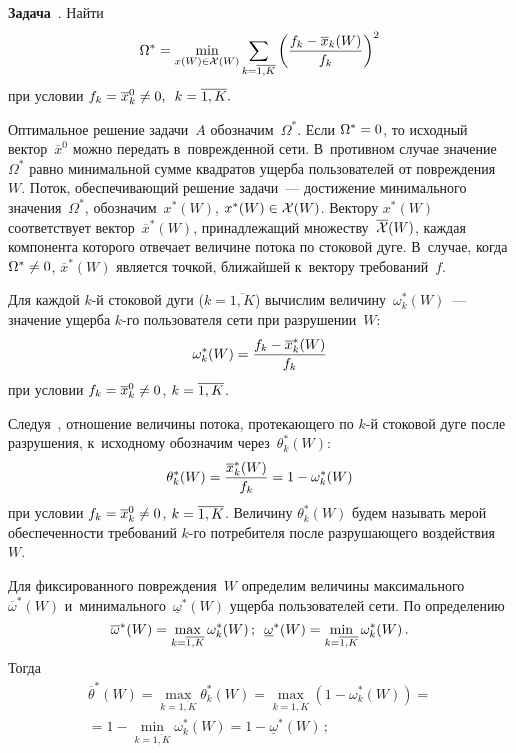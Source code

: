 \begin{multicols}{2}
\smallskip

\noindent
\textbf{Задача}~{}. Найти
$$
 \Omega^* =  \min\limits_{x(W) \in {\cal X}(W)} 
\sum\limits_{k = \overline{1, K}} \left(\displaystyle\frac{\displaystyle f_k - \overline x_k(W)\mathstrut}{\displaystyle f_k\mathstrut}\right)^2 
$$
при условии
$f_k\hm =  \overline x_k^0 \neq 0, \enskip k = \overline{1, K}.$

Оптимальное решение задачи~$A$ обозначим~$\Omega^*$. Если $\Omega^* \hm= 0$, 
то исходный вектор~$\overline x^0$ можно передать в~поврежденной сети.
В~противном случае значение~$\Omega^*$ равно минимальной сумме квадратов 
ущерба пользователей от повреждения~$W$.
Поток, обеспечивающий решение задачи~--- достижение минимального значения~$\Omega^*$, 
обозначим~$x^*(W)$, $x^*(W) \hm\in 
{\cal X}(W)$. Вектору $x^*(W)$ соответствует
вектор~$\overline {x}^*(W)$, принадлежащий множеству~$\overline {\cal X}(W)$, 
каж\-дая компонента которого отвечает величине потока по стоковой дуге. 
В~случае, когда $\Omega^* \hm\neq 0$, $\overline {x}^*(W)$ является точкой, 
ближайшей к~вектору требований~$f$.

Для каждой $k$-й стоковой дуги ($k = \overline{1, K}$) вычислим 
величину~$ \omega_k^*(W)$~--- значение ущерба $k$-го  пользователя сети 
при разрушении~$W$:
$$
\omega_k^*(W)=\displaystyle\frac{\displaystyle f_k - \overline x_k^*(W)\mathstrut}{\displaystyle f_k\mathstrut}
$$
при условии 
$f_k \hm=\overline x_k^0 \hm\neq 0$, $k \hm= \overline{1, K}$. 

\pagebreak

Следуя~\cite{Mal99}, отношение величины потока, протекающего по $k$-й стоковой 
дуге после разрушения, к~исходному обозначим через~$\theta_k^*(W)$:
$$
 \theta_k^*(W) = \displaystyle\frac{\displaystyle \overline x_k^*(W)\mathstrut}{\displaystyle f_k\mathstrut} = 1  -  \omega_k^*(W)
 $$  
 при условии 
 $f_k =  \overline x_k^0\hm\neq 0$, $k \hm= \overline{1, K}$.
Величину $\theta_k^*(W)$ будем называть мерой обеспеченности требований $k$-го 
потребителя после разрушающего воздействия~$W$.

Для фиксированного повреждения~$W$ определим величины 
максимального~$\overline {\omega}^*(W)$  
и~минимального~$\underline{\omega}^*(W)$ ущерба пользователей сети. По определению
$$
 \overline {\omega}^*(W) = \max\limits_{k = \overline{1, K}} \omega_k^*(W)\,; 
 \enskip \underline {\omega}^*(W) = \min\limits_{k = \overline{1, K}} \omega_k^*(W)\,.
 $$
Тогда
\begin{multline*}
 \overline {\theta}^*(W) = \max\limits_{k = \overline{1, K}} \theta_k^*(W) = 
\max\limits_{k = \overline{1, K}}\left(1 - \omega_k^*(W)\right) ={}\\
{}= 1 - 
\min\limits_{k = \overline{1, K}}\omega_k^*(W) = 1 - \underline {\omega}^*(W)\,; 
\end{multline*}


\end{multicols}
